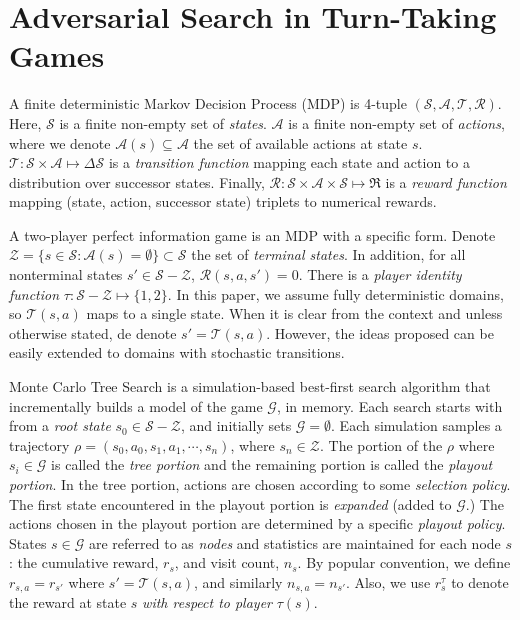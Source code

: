 \documentclass[letterpaper]{article}
\newcommand{\cA}{\mathcal{A}}
\newcommand{\cG}{\mathcal{G}}
\newcommand{\cR}{\mathcal{R}}
\newcommand{\cS}{\mathcal{S}}
\newcommand{\cT}{\mathcal{T}}
\newcommand{\cZ}{\mathcal{Z}}
\begin{document}

\section{Adversarial Search in Turn-Taking Games}


A finite deterministic Markov Decision Process (MDP) is 4-tuple $(\cS, \cA, \cT, \cR)$. Here, $\cS$ is a finite non-empty set of {\it states}. 
$\cA$ is a finite non-empty set of {\it actions}, where we denote $\cA(s) \subseteq \cA$ the set of available actions at state $s$. 
$\cT : \cS \times \cA \mapsto \Delta \cS$ is a {\it transition function} mapping 
each state and action to a distribution over successor states. Finally, $\cR : \cS \times \cA \times \cS \mapsto \Re$ 
is a {\it reward function} mapping (state, action, successor state) triplets to numerical rewards. 

A two-player perfect information game is an MDP with a specific form. 
Denote $\cZ = \{ s \in \cS: \cA(s) = \emptyset \} \subset \cS$ the set of {\it terminal states}. 
In addition, for all nonterminal states $s' \in \cS - \cZ$, $\cR(s,a,s') = 0$. 
There is a {\it player identity function} $\tau : \cS - \cZ \mapsto \{1,2\}$. 
In this paper, we assume fully deterministic domains, so $\cT(s,a)$ maps to a single state. 
When it is clear from the context and unless otherwise stated, de denote $s' = \cT(s,a)$. 
However, the ideas proposed can be easily extended to domains with stochastic transitions. 

Monte Carlo Tree Search is a simulation-based best-first search algorithm that incrementally builds a model of the game 
$\cG$, in memory. Each search starts with from a {\it root state} $s_0 \in \cS - \cZ$, and initially sets $\cG = \emptyset$. 
Each simulation samples a trajectory $\rho = (s_0, a_0, s_1, a_1, \cdots, s_n)$, where $s_n \in \cZ$. 
The portion of the $\rho$ where $s_i \in \cG$ is called the {\it tree portion} and the remaining portion is
called the {\it playout portion}. In the tree portion, actions are chosen according to some {\it selection policy}. 
The first state encountered in the playout portion is {\it expanded} (added to $\cG$.) 
The actions chosen in the playout portion are determined by a specific {\it playout policy}. 
States $s \in \cG$ are referred to as {\it nodes} and statistics are  
maintained for each node $s$: the cumulative reward, $r_s$, and visit count, $n_s$. 
By popular convention, we define $r_{s,a} = r_{s'}$ where $s' = \cT(s,a)$, and similarly $n_{s,a} = n_{s'}$. 
Also, we use $r^{\tau}_s$ to denote the reward at state $s$ {\it with respect to player} $\tau(s)$. 
\end{document}
